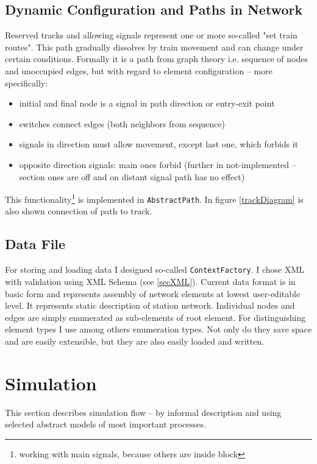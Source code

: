 \documentclass[english]{cls/fitthesis}
\newcommand{\cfr}[1]{\texttt{#1}}
\newcommand{\sourceRef}[1]{\cfr{#1}}
\begin{document}
    \subsection{Dynamic Configuration and Paths in Network}
      Reserved tracks and allowing signals represent one or more so-called
      "set train routes".
      This path gradually dissolves by train movement and can change under certain conditions.
      Formally it is a path from graph theory i.e. sequence of nodes and unoccupied edges,
      but with regard to element configuration -- more specifically:
      \begin{itemize}
        \item initial and final node is a signal in path direction or entry-exit point
        \item switches connect edges (both neighbors from sequence)
        \item signals in direction must allow movement, except last one, which forbids it
        \item opposite direction signals: main ones forbid (further in not-implemented -- section ones are off and on distant signal path has no effect)
      \end{itemize}
      This functionality\footnote{working with main signals, because others are inside block}
      is implemented in \sourceRef{AbstractPath}. In figure \ref{trackDiagram} is also
      shown connection of path to track.

    \subsection{Data File}
      For storing and loading data I designed so-called \sourceRef{ContextFactory}.
      I chose XML with validation using XML Schema (see \ref{secXML}).
      Current data format is in basic form and represents assembly of network elements at lowest
      user-editable level. It represents static description of station network.
      Individual nodes and edges are simply enumerated as sub-elements of root element.
      For distinguishing element types I use among others enumeration types. Not only do they save space and are easily extensible,
      but they are also easily loaded and written.

  \section{Simulation}
    This section describes simulation flow -- by informal description and using selected
    abstract models of most important processes.
\end{document}
